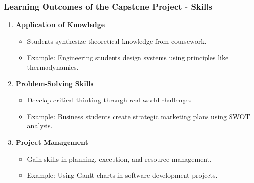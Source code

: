 \documentclass{beamer}
\begin{document}
\begin{frame}[fragile]
    \frametitle{Learning Outcomes of the Capstone Project - Skills}
    \begin{enumerate}
        \item \textbf{Application of Knowledge}
            \begin{itemize}
                \item Students synthesize theoretical knowledge from coursework.
                \item Example: Engineering students design systems using principles like thermodynamics.
            \end{itemize}

        \item \textbf{Problem-Solving Skills}
            \begin{itemize}
                \item Develop critical thinking through real-world challenges.
                \item Example: Business students create strategic marketing plans using SWOT analysis.
            \end{itemize}

        \item \textbf{Project Management}
            \begin{itemize}
                \item Gain skills in planning, execution, and resource management.
                \item Example: Using Gantt charts in software development projects.
            \end{itemize}
    \end{enumerate}
\end{frame}
\end{document}
